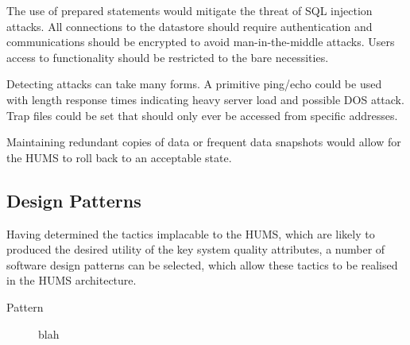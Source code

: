 \documentclass[10pt,a4paper]{article}
\begin{document}
\begin{description}
\begin{description}[noitemsep]
	\end{description}
\item[Security] \hfill
	\begin{description}[noitemsep]
	\item[Resisting Attacks] The use of prepared statements would mitigate the threat of SQL injection attacks. All connections to the datastore should require authentication and communications should be encrypted to avoid man-in-the-middle attacks. Users access to functionality should be restricted to the bare necessities. 
	\item[Detecting Attacks] Detecting attacks can take many forms. A primitive ping/echo could be used with length response times indicating heavy server load and possible DOS attack. Trap files could be set that should only ever be accessed from specific addresses.
	\item[Recovering From Attacks] Maintaining redundant copies of data or frequent data snapshots would allow for the HUMS to roll back to an acceptable state.
	\end{description}
\end{description}

\subsection{Design Patterns}
Having determined the tactics implacable to the HUMS, which are likely to produced the desired utility of the key system quality attributes, a number of software design patterns can be selected, which allow these tactics to be realised in the HUMS architecture.

\begin{description}
\item[Pattern] blah
\end{description}
\end{document}
